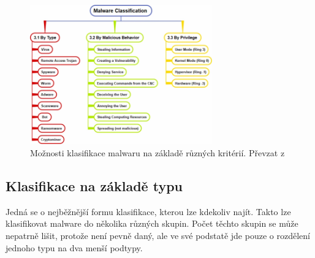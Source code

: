 \begin{figure}[h]
	\centering
        \includegraphics[width=0.7\textwidth]{obrazky/classification.png}
	\caption{Možnosti klasifikace malwaru na základě různých kritérií. Převzat z \cite{article_malware}}
    \label{classific}
\end{figure}
\newpage
\subsection*{Klasifikace na základě typu}
Jedná se o nejběžnější formu klasifikace, kterou lze kdekoliv najít. Takto lze klasifikovat malware do několika různých skupin. Počet těchto skupin se může nepatrně lišit, protože není pevně daný, ale ve své podstatě jde 
pouze o rozdělení jednoho typu na dva menší podtypy. 

